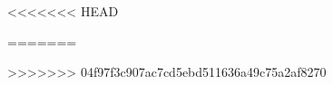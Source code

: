 \pagestyle{tipo_doc}
\setcounter{page}{1}
<<<<<<< HEAD







\clearpage
\newpage
=======


\newpage


\newpage

%
\newpage

%
\newpage

%
>>>>>>> 04f97f3c907ac7cd5ebd511636a49c75a2af8270
